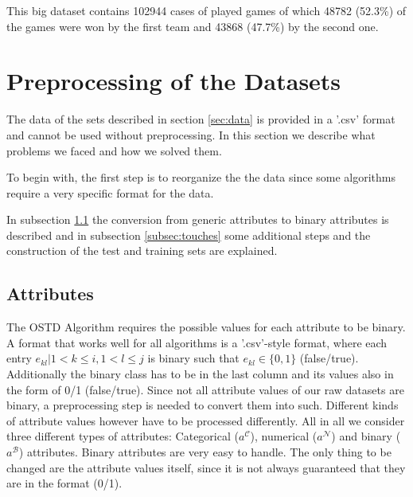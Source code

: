 \documentclass[a4paper,preprint]{sig-alternate-xt}
\begin{document}
This big dataset contains 102944 cases of played games of which 48782 (52.3\%) of the games were won by the first team and 43868 (47.7\%) by the second one.

\section{Preprocessing of the Datasets}
\label{sec:prepro}


The data of the sets described in section \ref{sec:data} is provided in a '.csv' format and cannot be used without preprocessing.
In this section we describe what problems we faced and how we solved them.

To begin with, the first step is to reorganize the the data since some algorithms require a very specific format for the data.

In subsection \ref{subsec:attr} the conversion from generic attributes to binary attributes is described and in subsection \ref{subsec:touches} some additional steps and the construction of the test and training sets are explained.

\subsection{Attributes}
\label{subsec:attr}
The OSTD Algorithm requires the possible values for each attribute to be binary.
A format that works well for all algorithms is a '.csv'-style format, where each entry $e_{kl}| 1 < k \leq i, 1 < l \leq j$ is binary such that $e_{kl} \in \{0, 1\}$ (false/true).
Additionally the binary class has to be in the last column and its values also in the form of 0/1 (false/true).
Since not all attribute values of our raw datasets are binary, a preprocessing step is needed to convert them into such.
Different kinds of attribute values however have to be processed differently.
All in all we consider three different types of attributes: Categorical ($a^\mathcal{C}$), numerical ($a^\mathcal{N}$) and binary ($a^\mathcal{B}$) attributes.
Binary attributes are very easy to handle. The only thing to be changed are the attribute values itself, since it is not always guaranteed that they are in the format (0/1).
\end{document}
